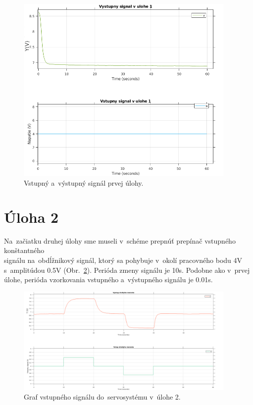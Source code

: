 \documentclass{article}
\begin{document}
\begin{figure}[!htbp]
	\begin{center}
		\includegraphics[width=0.95\textwidth]{include/uloha1_graf.png}
	\end{center}
	\caption{Vstupný a~výstupný signál prvej úlohy.}
	\label{fig:uloha1_graf}
\end{figure}

\clearpage

\section{Úloha 2}
\label{subsec:u2}

Na~začiatku druhej úlohy sme museli v~schéme prepnúť prepínač vstupného konštantného\\
signálu na~obdĺžnikový signál, ktorý sa pohybuje v~okolí pracovného bodu 4V s~amplitúdou 0.5V
(Obr.~\ref{fig:vstup2}). Perióda zmeny signálu je 10s. Podobne ako v~prvej úlohe,
perióda vzorkovania vstupného a~výstupného signálu je 0.01s.

\begin{figure}[!htbp]
	\begin{center}
		\includegraphics[width=0.95\textwidth]{include/vstup2_2.png}
	\end{center}
	\caption{Graf vstupného signálu do~servosystému v~úlohe 2.}
	\label{fig:vstup2}
\end{figure}
\end{document}
